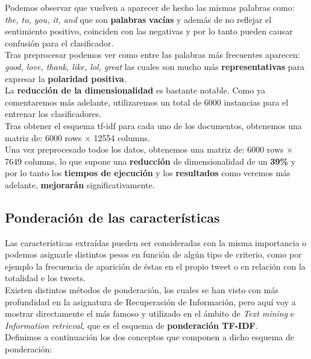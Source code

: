 \documentclass[a4paper,12pt]{report}
\begin{document}
{\setlength{\parindent}{0cm}
Podemos observar que vuelven a aparecer de hecho las mismas palabras como: \textit{the, to, you, it, and} que son \textbf{palabras} \textbf{vacías} y además de no reflejar el sentimiento positivo, coinciden con las negativas y por lo tanto pueden causar confusión para el clasificador. }
\vspace{2mm}\\
Tras preprocesar podemos ver como entre las palabras más frecuentes aparecen: \textit{good, love, thank, like, lol, great} las cuales son mucho más \textbf{representativas} para expresar la \textbf{polaridad positiva}.
\vspace{4mm}\\
La \textbf{reducción de la dimensionalidad} es bastante notable. Como ya comentaremos más adelante, utilizaremos un total de 6000 instancias para el entrenar los clasificadores. \\
Tras obtener el esquema tf-idf para cada uno de los documentos, obtenemos una matriz de:  6000 rows × 12554 columns.
\vspace{2mm}\\
Una vez preprocesado todos los datos, obtenemos una matriz de: 6000 rows × 7649 columns, 
lo que supone una \textbf{reducción} de dimensionalidad de un \textbf{39\%} y por lo tanto los \textbf{tiempos de ejecución} y los \textbf{resultados} como veremos más adelante, \textbf{mejorarán} significativamente. 
\vspace{4mm}

\subsection{Ponderación de las características}

{\setlength{\parindent}{0cm}
Las características extraídas pueden ser consideradas con la misma importancia o podemos asignarle distintos pesos en función de algún tipo de criterio, como por ejemplo la frecuencia de aparición de éstas en el propio tweet o en relación con la totalidad e los tweets.\vspace{2mm}\\
Existen distintos métodos de ponderación, los cuales se han visto con más profundidad en la asignatura de Recuperación de Información, pero aquí voy a mostrar directamente el más famoso y utilizado en el ámbito de \textit{Text mining} e \textit{Information retrieval}, que es el esquema de \textbf{ponderación TF-IDF}. 
\vspace{2mm}\\
Definimos a continuación los dos conceptos que componen a dicho esquema de ponderación: }
\vspace{2mm}
\end{document}
